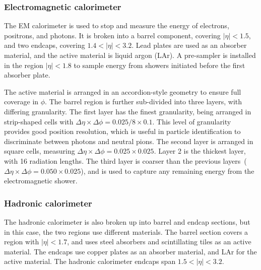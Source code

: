 \FloatBarrier
\subsubsection{Electromagnetic calorimeter} 
\label{sec:ecal}

The EM calorimeter is used to stop and measure the energy of electrons,
positrons, and photons.
It is broken into a barrel component, covering $|\eta| < 1.5$, and two endcaps,
covering $1.4 < |\eta| < 3.2$.
Lead plates are used as an absorber material, and the active material is
liquid argon (LAr).
A pre-sampler is installed in the region $|\eta| < 1.8$ to sample energy from
showers initiated before the first absorber plate.

The active material is arranged in an accordion-style geometry to ensure full
coverage in $\phi$.
The barrel region is further sub-divided into three layers, with differing
granularity.
The first layer has the finest granularity, being arranged in strip-shaped
cells with $\Delta\eta \times \Delta\phi = 0.025/8 \times 0.1$.
This level of granularity provides good position resolution, which is useful
in particle identification to discriminate between photons and neutral pions.
The second layer is arranged in square cells, measuring
$\Delta\eta \times \Delta\phi = 0.025 \times 0.025$.
Layer 2 is the thickest layer, with 16 radiation lengths.
The third layer is coarser than the previous
layers~($\Delta\eta \times \Delta\phi = 0.050 \times 0.025$), and is used to
capture any remaining energy from the electromagnetic shower.

\FloatBarrier
\subsubsection{Hadronic calorimeter} 
\label{sec:hcal}

The hadronic calorimeter is also broken up into barrel and endcap sections, but
in this case, the two regions use different materials.
The barrel section covers a region with $|\eta| < 1.7$, and uses steel
absorbers and scintillating tiles as an active material.
The endcaps use copper plates as an absorber material, and LAr for the active
material.
The hadronic calorimeter endcaps span $1.5 < |\eta| < 3.2$.

